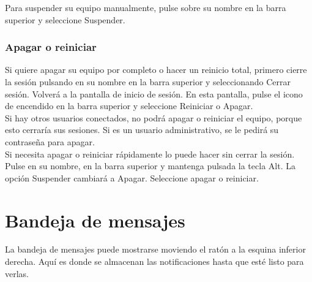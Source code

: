 Para suspender su equipo manualmente, pulse sobre su nombre en la barra superior y seleccione Suspender.
\subsubsection{Apagar o reiniciar}
Si quiere apagar su equipo por completo o hacer un reinicio total, primero cierre la sesión pulsando en su nombre en la barra superior y seleccionando Cerrar sesión. Volverá a la pantalla de inicio de sesión. En esta pantalla, pulse el icono de encendido en la barra superior y seleccione Reiniciar o Apagar.\\
Si hay otros usuarios conectados, no podrá apagar o reiniciar el equipo, porque esto cerraría sus sesiones. Si es un usuario administrativo, se le pedirá su contraseña para apagar.\\

Si necesita apagar o reiniciar rápidamente lo puede hacer sin cerrar la sesión. Pulse en su nombre, en la barra superior y mantenga pulsada la tecla Alt. La opción Suspender cambiará a Apagar. Seleccione apagar o reiniciar.
\section{Bandeja de mensajes}
La bandeja de mensajes puede mostrarse moviendo el ratón a la esquina inferior derecha. Aquí es donde se almacenan las notificaciones hasta que esté listo para verlas.

